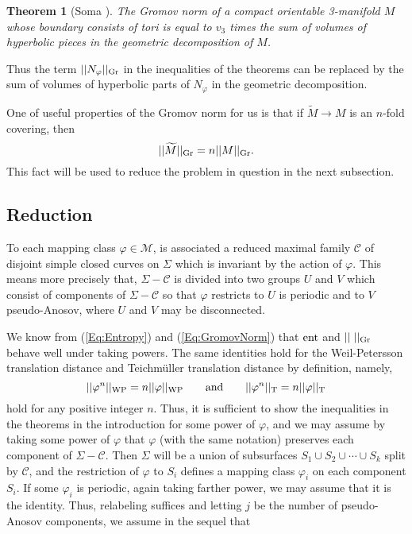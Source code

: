 \documentclass[11pt,reqno]{amsart}
\newtheorem{theorem}{{\bf Theorem}}
\numberwithin{equation}{section}
\begin{document}
\begin{theorem}[Soma \cite{Soma}]\label{Thm:Soma}
The Gromov norm of a compact orientable 3-manifold  $M$   
whose boundary consists of tori is equal to  $v_3$  times 
the sum of volumes of hyperbolic pieces in 
the geometric decomposition of  $M$. 
\end{theorem}

\noindent
Thus the term  $|| N_{\varphi} ||_{{\rm Gr}}$  in the inequalities of the theorems   
can be replaced by the sum of volumes of hyperbolic parts 
of  $N_{\varphi}$  in the geometric decomposition.  

One of useful properties of the Gromov norm for us is that 
if  $\widetilde{M} \to M$  is an $n$-fold covering, 
then  
\begin{equation}\label{Eq:GromovNorm} 
	|| \widetilde{M} ||_{{\rm Gr}} = n || M ||_{{\rm Gr}}.  
\end{equation}  
This fact will be used to reduce the problem in question in the next subsection. 

\subsection{Reduction}  

To each mapping class  $\varphi \in \mathcal{M}$,  
is associated a reduced maximal family  $\mathcal{C}$  of disjoint 
simple closed curves on  $\varSigma$  which is invariant 
by the action of  $\varphi$.  
This means more precisely that, 
$\varSigma - \mathcal{C}$  is divided into two groups  $U$  and  $V$  
which consist of 
components of  $\varSigma - \mathcal{C}$    
so that  $\varphi$ restricts to  $U$  is periodic and  to  $V$  pseudo-Anosov, 
where  $U$  and  $V$  may be disconnected.  

We know from  (\ref{Eq:Entropy})  and  (\ref{Eq:GromovNorm})  that   
${\rm ent}$  and  $|| \; ||_{\rm Gr}$  behave well under taking powers.  
The same identities hold for the Weil-Petersson translation distance and Teichm\"uller translation distance 
by definition, 
namely,  
\begin{equation*} 
	|| \varphi^n ||_{{\rm WP}} = n || \varphi ||_{{\rm WP}}  
	\qquad  \text{and}  \qquad 
	|| \varphi^n ||_{{\rm T}} = n || \varphi ||_{{\rm T}}
\end{equation*} 
hold for any positive integer  $n$.  
Thus,
it is sufficient to show the inequalities in the theorems in the introduction   
for some power of  $\varphi$,  
and we may assume by taking some power of  $\varphi$  that 
$\varphi$  (with the same notation)   
preserves each component of  $\varSigma - \mathcal{C}$.  
Then  $\varSigma$  will be a union of subsurfaces 
$S_1 \cup S_2 \cup \cdots \cup S_k$  split by  $\mathcal{C}$, and 
the restriction of  $\varphi$  to  $S_i$  defines a mapping 
class  $\varphi_i$  on each component  $S_i$.  
If some  $\varphi_i$  is periodic, 
again taking farther power, 
we may assume that it is the identity.  
Thus, 
relabeling suffices 
and letting  $j$  be the number of pseudo-Anosov components, 
we assume in the sequel that 
\end{document}
